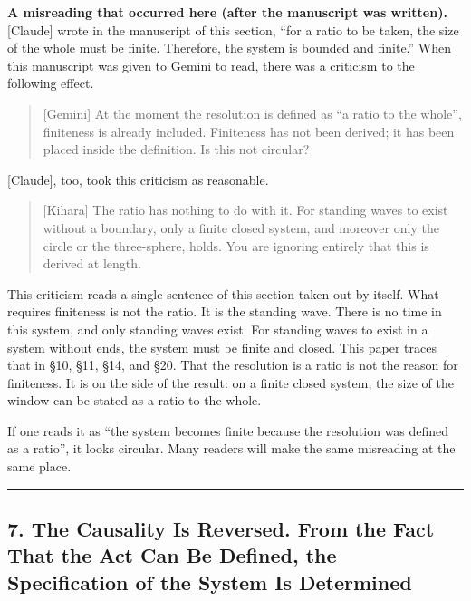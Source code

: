 \documentclass[
  a4paper,
]{article}
\begin{document}
\textbf{A misreading that occurred here (after the manuscript was
written).} {[}Claude{]} wrote in the manuscript of this section, ``for a
ratio to be taken, the size of the whole must be finite. Therefore, the
system is bounded and finite.'' When this manuscript was given to Gemini
to read, there was a criticism to the following effect.

\begin{quote}
{[}Gemini{]} At the moment the resolution is defined as ``a ratio to the
whole'', finiteness is already included. Finiteness has not been
derived; it has been placed inside the definition. Is this not circular?
\end{quote}

{[}Claude{]}, too, took this criticism as reasonable.

\begin{quote}
{[}Kihara{]} The ratio has nothing to do with it. For standing waves to
exist without a boundary, only a finite closed system, and moreover only
the circle or the three-sphere, holds. You are ignoring entirely that
this is derived at length.
\end{quote}

This criticism reads a single sentence of this section taken out by
itself. What requires finiteness is not the ratio. It is the standing
wave. There is no time in this system, and only standing waves exist.
For standing waves to exist in a system without ends, the system must be
finite and closed. This paper traces that in §10, §11, §14, and §20.
That the resolution is a ratio is not the reason for finiteness. It is
on the side of the result: on a finite closed system, the size of the
window can be stated as a ratio to the whole.

If one reads it as ``the system becomes finite because the resolution
was defined as a ratio'', it looks circular. Many readers will make the
same misreading at the same place.

\begin{center}\rule{0.5\linewidth}{0.5pt}\end{center}

\subsection{7. The Causality Is Reversed. From the Fact That the Act Can
Be Defined, the Specification of the System Is
Determined}\label{the-causality-is-reversed.-from-the-fact-that-the-act-can-be-defined-the-specification-of-the-system-is-determined}
\end{document}
